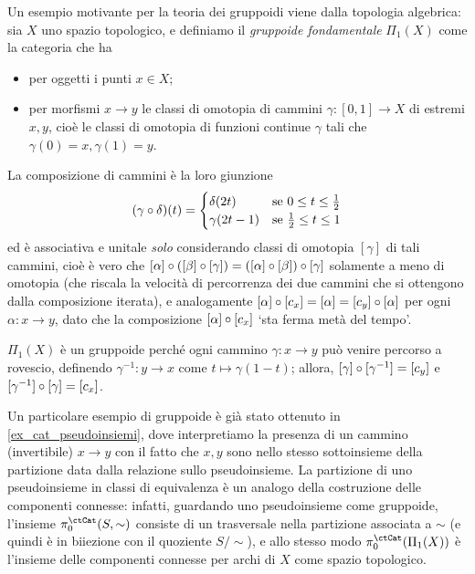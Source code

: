 \begin{definition}\label{es_gruppoide_fondamentale}
	Un esempio motivante per la teoria dei gruppoidi viene dalla topologia algebrica: sia \(X\) uno spazio topologico, e definiamo il \emph{gruppoide fondamentale} \(\Pi_1(X)\) come la categoria che ha
	\begin{itemize}
		\item per oggetti i punti \(x\in X\);
		\item per morfismi \(x\to y\) le classi di omotopia di cammini \(\gamma : [0,1] \to X\) di estremi \(x,y\), cioè le classi di omotopia di funzioni continue \(\gamma\) tali che \(\gamma(0)=x, \gamma(1)=y\).
	\end{itemize}
	La composizione di cammini è la loro giunzione
	\[
		(\gamma\circ \delta)(t) =
		\begin{cases}
			\delta(2t)   & \text{se } 0\le t\le \frac 12  \\
			\gamma(2t-1) & \text{se } \frac 12 \le t\le 1 \\
		\end{cases}\]
	ed è associativa e unitale \emph{solo} considerando classi di omotopia \([\gamma]\) di tali cammini, cioè è vero che \([\alpha] \circ \left([\beta] \circ [\gamma]\right) = \left([\alpha] \circ [\beta]\right) \circ [\gamma]\) solamente a meno di omotopia (che riscala la velocità di percorrenza dei due cammini che si ottengono dalla composizione iterata), e analogamente \([\alpha]\circ [c_x] = [\alpha] = [c_y]\circ [\alpha]\) per ogni \(\alpha : x\to y\), dato che la composizione \([\alpha]\circ [c_x]\) `sta ferma metà del tempo'.

	\(\Pi_1(X)\) è un gruppoide perché ogni cammino \(\gamma : x\to y\) può venire percorso a rovescio, definendo \(\gamma^{-1} : y\to x\) come \(t\mapsto\gamma(1-t)\); allora, \([\gamma]\circ[\gamma^{-1}] = [c_y]\) e \([\gamma^{-1}]\circ [\gamma] = [c_x]\).
\end{definition}
Un particolare esempio di gruppoide è già stato ottenuto in \ref{ex_cat_pseudoinsiemi}, dove interpretiamo la presenza di un cammino (invertibile) \(x\to y\) con il fatto che \(x,y\) sono nello stesso sottoinsieme della partizione data dalla relazione sullo pseudoinsieme. La partizione di uno pseudoinsieme in classi di equivalenza è un analogo della costruzione delle componenti connesse: infatti, guardando uno pseudoinsieme come gruppoide, l'insieme \(\pi_0^\ctCat(S,\sim)\) consiste di un trasversale nella partizione associata a \(\sim\) (e quindi è in biiezione con il quoziente $S/\sim$), e allo stesso modo \(\pi_0^\ctCat(\Pi_1(X))\) è l'insieme delle componenti connesse per archi di \(X\) come spazio topologico.

